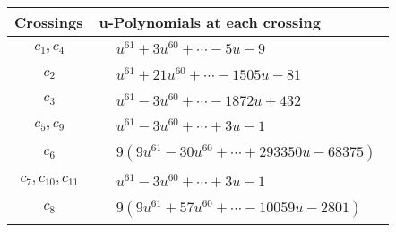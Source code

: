 \documentclass[1p]{elsarticle_modified}
\theoremstyle{definition}
\begin{document}
\begin{tabular}{m{50pt}|m{274pt}}
Crossings & \hspace{64pt}u-Polynomials at each crossing \\
\hline $$\begin{aligned}c_{1},c_{4}\end{aligned}$$&$\begin{aligned}
&u^{61}+3 u^{60}+\cdots-5 u-9
\end{aligned}$\\
\hline $$\begin{aligned}c_{2}\end{aligned}$$&$\begin{aligned}
&u^{61}+21 u^{60}+\cdots-1505 u-81
\end{aligned}$\\
\hline $$\begin{aligned}c_{3}\end{aligned}$$&$\begin{aligned}
&u^{61}-3 u^{60}+\cdots-1872 u+432
\end{aligned}$\\
\hline $$\begin{aligned}c_{5},c_{9}\end{aligned}$$&$\begin{aligned}
&u^{61}-3 u^{60}+\cdots+3 u-1
\end{aligned}$\\
\hline $$\begin{aligned}c_{6}\end{aligned}$$&$\begin{aligned}
&9(9 u^{61}-30 u^{60}+\cdots+293350 u-68375)
\end{aligned}$\\
\hline $$\begin{aligned}c_{7},c_{10},c_{11}\end{aligned}$$&$\begin{aligned}
&u^{61}-3 u^{60}+\cdots+3 u-1
\end{aligned}$\\
\hline $$\begin{aligned}c_{8}\end{aligned}$$&$\begin{aligned}
&9(9 u^{61}+57 u^{60}+\cdots-10059 u-2801)
\end{aligned}$\\
\hline
\end{tabular}\\~\\
\newpage\renewcommand{\arraystretch}{1}
\end{document}
